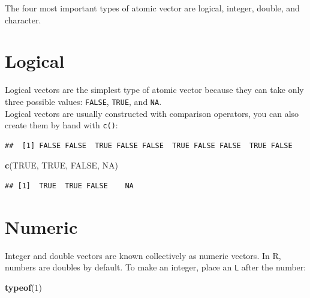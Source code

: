 \documentclass[
]{book}
\newenvironment{Shaded}{\begin{snugshade}}{\end{snugshade}}
\newcommand{\DecValTok}[1]{\textcolor[rgb]{0.00,0.00,0.81}{#1}}
\newcommand{\KeywordTok}[1]{\textcolor[rgb]{0.13,0.29,0.53}{\textbf{#1}}}
\newcommand{\NormalTok}[1]{#1}
\newcommand{\OperatorTok}[1]{\textcolor[rgb]{0.81,0.36,0.00}{\textbf{#1}}}
\newcommand{\OtherTok}[1]{\textcolor[rgb]{0.56,0.35,0.01}{#1}}
\newcommand{\StringTok}[1]{\textcolor[rgb]{0.31,0.60,0.02}{#1}}
\begin{document}
The four most important types of atomic vector are logical, integer, double, and character.

\hypertarget{logical}{%
\section{Logical}\label{logical}}

Logical vectors are the simplest type of atomic vector because they can take only three possible values: \texttt{FALSE}, \texttt{TRUE}, and \texttt{NA}.\\
Logical vectors are usually constructed with comparison operators, you can also create them by hand with \texttt{c()}:

\begin{Shaded}
\end{Shaded}

\begin{verbatim}
##  [1] FALSE FALSE  TRUE FALSE FALSE  TRUE FALSE FALSE  TRUE FALSE
\end{verbatim}

\begin{Shaded}
\begin{Highlighting}[]
\KeywordTok{c}\NormalTok{(}\OtherTok{TRUE}\NormalTok{, }\OtherTok{TRUE}\NormalTok{, }\OtherTok{FALSE}\NormalTok{, }\OtherTok{NA}\NormalTok{)}
\end{Highlighting}
\end{Shaded}

\begin{verbatim}
## [1]  TRUE  TRUE FALSE    NA
\end{verbatim}

\hypertarget{numeric}{%
\section{Numeric}\label{numeric}}

Integer and double vectors are known collectively as numeric vectors. In R, numbers are doubles by default.
To make an integer, place an \texttt{L} after the number:

\begin{Shaded}
\begin{Highlighting}[]
\KeywordTok{typeof}\NormalTok{(}\DecValTok{1}\NormalTok{)}
\end{Highlighting}
\end{Shaded}
\end{document}
